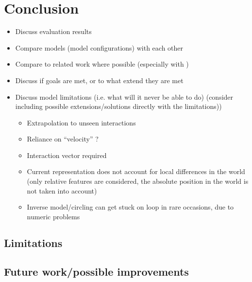 \chapter{Conclusion \label{chap:conclusion}}



\begin{itemize}
	\item Discuss evaluation results
	\item Compare models (model configurations) with each other
	\item Compare to related work where possible (especially with \cite{pushing})
	\item Discuss if goals are met, or to what extend they are met
	\item Discuss model limitations (i.e. what will it never be able to do) (consider including possible extensions/solutions directly with the limitations))
	\begin{itemize}
		\item Extrapolation to unseen interactions
		\item Reliance on \enquote{velocity} ?
		\item Interaction vector required
		\item Current representation does not account for local differences in the world (only relative features are considered, the absolute position in the world is not taken into account)
		\item Inverse model/circling can get stuck on loop in rare occasions, due to numeric problems
	\end{itemize}
\end{itemize}

\section{Limitations}

\section{Future work/possible improvements}